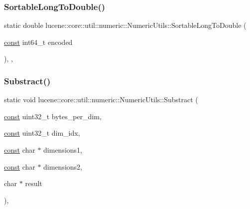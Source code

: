\mbox{\label{classlucene_1_1core_1_1util_1_1numeric_1_1NumericUtils_ae1b4379e1894fbf903e7d9a32f60cfcc}} 
\subsubsection{\texorpdfstring{Sortable\+Long\+To\+Double()}{SortableLongToDouble()}}
{\footnotesize\ttfamily static double lucene\+::core\+::util\+::numeric\+::\+Numeric\+Utils\+::\+Sortable\+Long\+To\+Double (\begin{DoxyParamCaption}\item[{\mbox{\hyperlink{ZlibCrc32_8h_a2c212835823e3c54a8ab6d95c652660e}{const}} int64\+\_\+t}]{encoded }\end{DoxyParamCaption})\hspace{0.3cm}{\ttfamily [inline]}, {\ttfamily [static]}, {\ttfamily [noexcept]}}

\mbox{\label{classlucene_1_1core_1_1util_1_1numeric_1_1NumericUtils_a95837a28f8cd7df6f0f2dee82fb3563f}} 
\subsubsection{\texorpdfstring{Substract()}{Substract()}}
{\footnotesize\ttfamily static void lucene\+::core\+::util\+::numeric\+::\+Numeric\+Utils\+::\+Substract (\begin{DoxyParamCaption}\item[{\mbox{\hyperlink{ZlibCrc32_8h_a2c212835823e3c54a8ab6d95c652660e}{const}} uint32\+\_\+t}]{bytes\+\_\+per\+\_\+dim,  }\item[{\mbox{\hyperlink{ZlibCrc32_8h_a2c212835823e3c54a8ab6d95c652660e}{const}} uint32\+\_\+t}]{dim\+\_\+idx,  }\item[{\mbox{\hyperlink{ZlibCrc32_8h_a2c212835823e3c54a8ab6d95c652660e}{const}} char $\ast$}]{dimensions1,  }\item[{\mbox{\hyperlink{ZlibCrc32_8h_a2c212835823e3c54a8ab6d95c652660e}{const}} char $\ast$}]{dimensions2,  }\item[{char $\ast$}]{result }\end{DoxyParamCaption})\hspace{0.3cm}{\ttfamily [inline]}, {\ttfamily [static]}}

